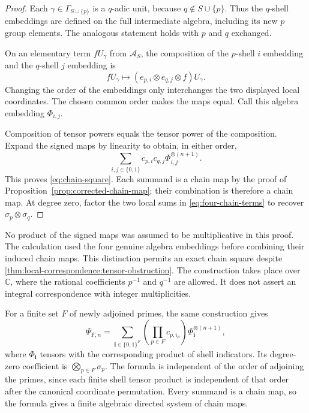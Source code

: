 \documentclass[11pt,letterpaper]{article}
\theoremstyle{definition}
\theoremstyle{remark}
\newcommand{\C}{\mathbb C}
\begin{document}
\begin{proof}
Each $\gamma\in\Gamma_{S\cup\{p\}}$ is a $q$-adic
unit, because $q\notin S\cup\{p\}$. Thus the
$q$-shell embeddings are defined on the full intermediate
algebra, including its new $p$ group elements. The analogous
statement holds with $p$ and $q$ exchanged.

On an elementary term $fU_\gamma$ from $\mathcal A_S$,
the composition of the $p$-shell $i$ embedding and
the $q$-shell $j$ embedding is
\begin{equation}\label{eq:two-shell-map}
 fU_\gamma\longmapsto(e_{p,i}\otimes e_{q,j}\otimes f)U_\gamma.
\end{equation}
Changing the order of the embeddings only interchanges the
two displayed local coordinates. The chosen common order
makes the maps equal. Call this algebra embedding
$\Phi_{i,j}$.

Composition of tensor powers equals the tensor power
of the composition. Expand the signed maps by linearity
to obtain, in either order,
\begin{equation}\label{eq:four-chain-terms}
 \sum_{i,j\in\{0,1\}}c_{p,i}c_{q,j}
            \Phi_{i,j}^{\otimes(n+1)}.
\end{equation}
This proves \eqref{eq:chain-square}. Each summand is a
chain map by the proof of
Proposition~\ref{prop:corrected-chain-map}; their combination is
therefore a chain map. At degree zero, factor the two
local sums in \eqref{eq:four-chain-terms} to recover
$\sigma_p\otimes\sigma_q$.
\end{proof}

No product of the signed maps was assumed to be
multiplicative in this proof. The calculation used the
four genuine algebra embeddings before combining their
induced chain maps. This distinction permits an exact
chain square despite
\cref{thm:local-correspondence:tensor-obstruction}.
The construction takes place over $\C$, where the
rational coefficients $p^{-1}$ and $q^{-1}$ are allowed.
It does not assert an integral correspondence with
integer multiplicities.

For a finite set $F$ of newly adjoined primes, the same
construction gives
\begin{equation}\label{eq:finite-chain-map}
 \Psi_{F,n}=
 \sum_{\mathbf i\in\{0,1\}^{F}}
 \left(\prod_{p\in F}c_{p,i_p}\right)
 \Phi_{\mathbf i}^{\otimes(n+1)},
\end{equation}
where $\Phi_{\mathbf i}$ tensors with the corresponding
product of shell indicators. Its degree-zero coefficient
is $\bigotimes_{p\in F}\sigma_p$. The formula is
independent of the order of adjoining the primes, since
each finite shell tensor product is independent of
that order after the canonical coordinate permutation.
Every summand is a chain map, so the formula gives a
finite algebraic directed system of chain maps.
\end{document}
